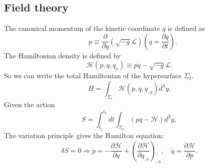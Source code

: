 \subsection{Field theory}
The canonical momentum of the kinetic coordinate $q$ is defined as
\[\quad p \equiv \frac{\partial}{\partial \dot{q}}(\sqrt{-g} \mathcal{L}) \left( \dot{q} = \frac{\partial q}{\partial t} \right). \]
The Hamiltonian density is defined by
\[\mathcal{H}(p,q,q_a) \equiv p\dot{q} - \sqrt{-g} \mathcal{L}.\]
So we can write the total Hamiltonian of the hypersurface $\Sigma_t$.
\[H = \int_{\Sigma_t} \mathcal{H}(p,q,q_{,a})d^3y.\]
Given the action
\[S = \int_{t_1}^{t_2} dt \int_{\Sigma_t} (p \dot{q} - \mathcal{H} ) d^3 y,\]
The variation principle gives the Hamilton equation:
\[\delta S = 0 \Rightarrow \dot{p} = -\frac{\partial \mathcal{H}}{\partial q} + \left(\frac{\partial \mathcal{H}}{\partial q_{,a}}\right)_{,a}, \quad \dot{q} = \frac{\partial \mathcal{H}}{\partial p}.\]
